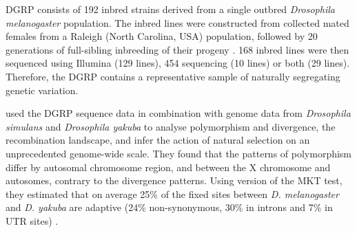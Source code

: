 %
DGRP consists of 192 inbred strains derived from a single outbred \textit{Drosophila melanogaster} population.
The inbred lines were constructed from collected mated females from a Raleigh (North Carolina, USA) population, followed by 20 generations of full-sibling inbreeding of their progeny \citep{Mackay2012}.
168 inbred lines were then sequenced using Illumina (129 lines), 454 sequencing (10 lines) or both (29 lines). Therefore, the DGRP contains a representative sample of naturally segregating genetic variation.

\citealp{Mackay2012} used the DGRP sequence data in combination with genome data from \textit{Drosophila simulans} and \textit{Drosophila yakuba} to analyse polymorphism and divergence, the recombination landscape, and infer the action of natural selection on an unprecedented genome-wide scale.
They found that the patterns of polymorphism differ by autosomal chromosome region, and between the X chromosome and autosomes, contrary to the divergence patterns.
Using version of the MKT test, they estimated that on average 25\% of the fixed sites between \textit{D. melanogaster} and \textit{D. yakuba} are adaptive (24\% non-synonymous, 30\% in introns and 7\% in UTR sites) \citep{Mackay2012}.